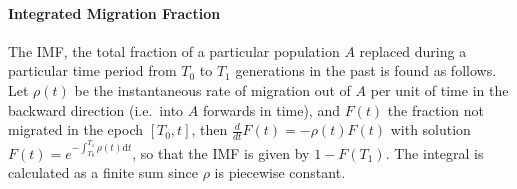 \paragraph{Integrated Migration Fraction}
The IMF, the total fraction of a particular population $A$ replaced during a particular time period from $T_0$ to $T_1$ generations in the past is found as follows. Let $\rho(t)$ be the instantaneous rate of migration out of $A$ per unit of time in the backward direction (i.e.\ into $A$ forwards in time), and $F(t)$ the fraction not migrated in the epoch $[T_0,t]$, then $\frac{d}{dt} F(t) = -\rho(t) F(t)$ with solution $F(t) = e^{- \int_{T_0}^{T_1} \rho(t) {\mathrm{d}t}}$, so that the IMF is given by $1-F(T_1)$.  The integral is calculated as a finite sum since $\rho$ is piecewise constant.
